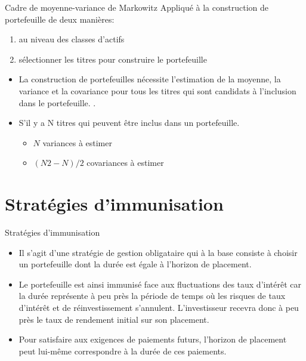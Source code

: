 \documentclass{beamer}
\begin{document}
\begin{frame}{Cadre de moyenne-variance de Markowitz}
Appliqué à la construction de portefeuille de deux manières:
\begin{enumerate}[label=\arabic*)]
\item au niveau des classes d'actifs
\item sélectionner les titres pour construire le portefeuille
\end{enumerate}

\begin{itemize}[label=\bullet]
\item La construction de portefeuilles nécessite l'estimation de la moyenne,  la variance et la covariance pour tous les titres qui sont candidats à l'inclusion dans le portefeuille. .
\item S'il y a N titres qui peuvent être inclus dans un portefeuille.
\begin{itemize}[label=*]
\item $N$ variances à estimer 
\item $(N2 - N) / 2$ covariances à estimer
\end{itemize}
\end{itemize}
\end{frame}

\section{Stratégies d’immunisation}
\begin{frame}{Stratégies d’immunisation}
\begin{itemize}[label=\bullet]
\item Il s’agit d’une stratégie de gestion obligataire qui à la base consiste à choisir un portefeuille dont la durée est égale à l’horizon de placement.
\item Le portefeuille est ainsi immunisé face aux fluctuations des taux d’intérêt car la durée représente à peu près la période de temps où les risques de taux d’intérêt et de réinvestissement s’annulent. L’investisseur recevra donc à peu près le taux de rendement initial sur son placement.  
\item Pour satisfaire aux exigences de paiements futurs, l’horizon de placement peut lui-même correspondre à la durée de ces paiements.  
\end{itemize}
\end{frame}
\end{document}
